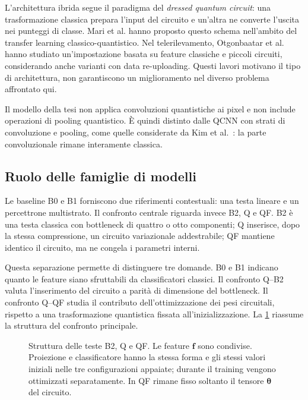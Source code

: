 L'architettura ibrida segue il paradigma del \emph{dressed quantum
circuit}: una trasformazione classica prepara l'input del circuito e
un'altra ne converte l'uscita nei punteggi di classe. Mari et al.
\cite{mari2020transfer} hanno proposto questo schema nell'ambito del
transfer learning classico-quantistico. Nel telerilevamento, Otgonbaatar
et al.~\cite{otgonbaatar2023transfer} hanno studiato un'impostazione
basata su feature classiche e piccoli circuiti, considerando anche
varianti con data re-uploading. Questi lavori motivano il tipo di
architettura, non garantiscono un miglioramento nel diverso problema
affrontato qui.

Il modello della tesi non applica convoluzioni quantistiche ai pixel e
non include operazioni di pooling quantistico. È quindi distinto dalle
QCNN con strati di convoluzione e pooling, come quelle considerate da
Kim et al.~\cite{kim2023transfer}: la parte convoluzionale rimane
interamente classica.

\subsection{Ruolo delle famiglie di modelli}

Le baseline B0 e B1 forniscono due riferimenti contestuali: una testa
lineare e un percettrone multistrato. Il confronto centrale riguarda
invece B2, Q e QF. B2 è una testa classica con bottleneck di quattro o
otto componenti; Q inserisce, dopo la stessa compressione, un circuito
variazionale addestrabile; QF mantiene identico il circuito, ma ne
congela i parametri interni.

Questa separazione permette di distinguere tre domande. B0 e B1
indicano quanto le feature siano sfruttabili da classificatori classici.
Il confronto Q--B2 valuta l'inserimento del circuito a parità di
dimensione del bottleneck. Il confronto Q--QF studia il contributo
dell'ottimizzazione dei pesi circuitali, rispetto a una trasformazione
quantistica fissata all'inizializzazione. La \cref{fig:pipeline-modelli}
riassume la struttura del confronto principale.

\begin{figure}[tbp]
\centering

\caption{Struttura delle teste B2, Q e QF. Le feature \(\boldsymbol f\)
sono condivise. Proiezione e classificatore hanno la stessa forma e
gli stessi valori iniziali nelle tre configurazioni appaiate; durante
il training vengono ottimizzati separatamente. In QF rimane fisso
soltanto il tensore \(\boldsymbol\theta\) del circuito.}
\label{fig:pipeline-modelli}
\end{figure}

